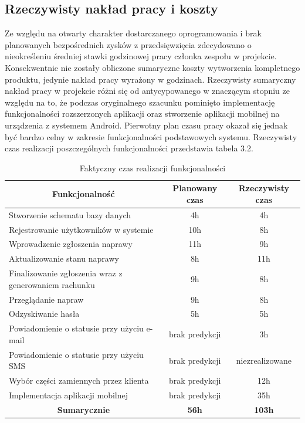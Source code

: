 \documentclass[a4paper,11pt]{article}
\begin{document}
\subsection{Rzeczywisty nakład pracy i koszty}
Ze względu na otwarty charakter dostarczanego oprogramowania i brak planowanych bezpośrednich zysków z przedsięwzięcia zdecydowano o nieokreśleniu średniej stawki godzinowej pracy członka zespołu w projekcie. Konsekwentnie nie zostały obliczone sumaryczne koszty wytworzenia kompletnego produktu, jedynie nakład pracy wyrażony w godzinach.
Rzeczywisty sumaryczny nakład pracy w projekcie różni się od antycypowanego w znaczącym stopniu ze względu na to, że podczas oryginalnego szacunku pominięto implementację funkcjonalności rozszerzonych aplikacji oraz stworzenie aplikacji mobilnej na urządzenia z systemem Android. Pierwotny plan czasu pracy okazał się jednak być bardzo celny w zakresie funkcjonalności podstawowych systemu. Rzeczywisty czas realizacji poszczególnych funkcjonalności  przedstawia tabela 3.2.
\begin{table}[H]
	\centering
	\caption{Faktyczny czas realizacji funkcjonalności}
	\bgroup
	\begin{tabular}{|l|c|c|}
		\hline
		\multicolumn{1}{|c|}{\textbf{Funkcjonalność}} & \textbf{Planowany czas} &\textbf{Rzeczywisty czas}\\ \hline \hline
		Stworzenie schematu bazy danych & 4h & 4h\\ \hline
		Rejestrowanie użytkowników w systemie & 10h & 8h \\ \hline
		Wprowadzenie zgłoszenia naprawy & 11h & 9h \\ \hline
		Aktualizowanie stanu naprawy & 8h & 11h\\ \hline
		Finalizowanie zgłoszenia wraz z generowaniem rachunku & 9h & 8h \\ \hline
		Przeglądanie napraw & 9h  & 8h\\ \hline
		Odzyskiwanie hasła & 5h & 5h\\ \hline
		Powiadomienie o statusie przy użyciu e-mail & brak predykcji & 3h\\ \hline
		Powiadomienie o statusie przy użyciu SMS & brak predykcji & niezrealizowane\\ \hline
		Wybór części zamiennych przez klienta & brak predykcji & 12h\\ \hline
		Implementacja aplikacji mobilnej & brak predykcji & 35h\\ \hline \hline
		\multicolumn{1}{|c|}{\textbf{Sumarycznie}} & \textbf{56h} & \textbf{103h} \\ \hline
	\end{tabular}
	\egroup
\end{table}
\end{document}
